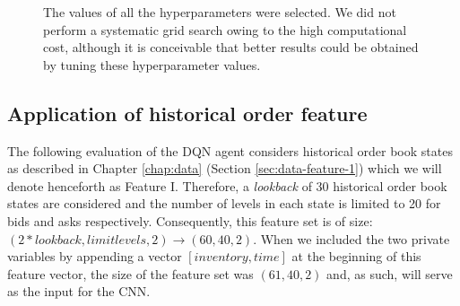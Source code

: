 \begin{figure}[H]
    \centering
    \caption{The values of all the hyperparameters were selected. We did not perform a systematic grid search owing to the high computational cost, although it is conceivable that better results could be obtained by tuning these hyperparameter values.}
    \label{fig:eval-dqn-hyperparameters}
\end{figure}

\subsection{Application of historical order feature}

The following evaluation of the DQN agent considers historical order book states as described in Chapter \ref{chap:data} (Section \ref{sec:data-feature-1}) which we will denote henceforth as Feature I.
Therefore, a \textit{lookback} of 30 historical order book states are considered and the number of levels in each state is limited to 20 for bids and asks respectively.
Consequently, this feature set is of size: $(2*lookback, limit levels, 2) \rightarrow (60, 40, 2)$.
When we included the two private variables by appending a vector $[inventory, time]$ at the beginning of this feature vector, the size of the feature set was $(61, 40, 2)$ and, as such, will serve as the input for the CNN.

